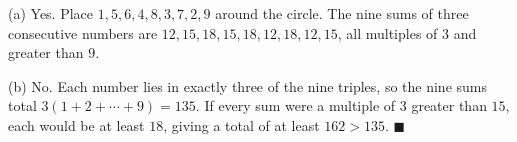 (a) Yes. Place $1,5,6,4,8,3,7,2,9$ around the circle. The nine sums of three consecutive numbers are $12,15,18,15,18,12,18,12,15$, all multiples of $3$ and greater than $9$.

(b) No. Each number lies in exactly three of the nine triples, so the nine sums total $3(1+2+\cdots+9)=135$. If every sum were a multiple of $3$ greater than $15$, each would be at least $18$, giving a total of at least $162>135$. $\blacksquare$
